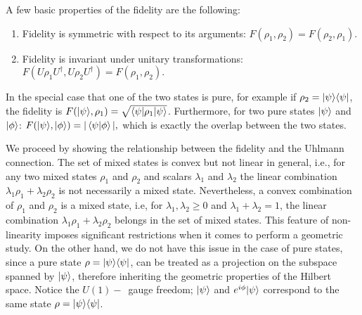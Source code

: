A few basic properties of the fidelity are the following:

\begin{enumerate}
	\item Fidelity is symmetric with respect to its arguments: $F(\rho_1,\rho_2)=F(\rho_2,\rho_1)$.
	\item Fidelity is invariant under unitary transformations: $F(U\rho_1 U^\dagger,U\rho_2 U^\dagger)=F(\rho_1,\rho_2).$
\end{enumerate}
In the special case that one of the two states is pure, for example if $\rho_2=| \psi \rangle\langle \psi |$, the fidelity is $F(| \psi \rangle,\rho_1)=\sqrt{\braket{\psi|\rho_1|\psi}}$. Furthermore, for two pure states $| \psi \rangle$ and $| \phi \rangle$: $F(| \psi \rangle,| \phi \rangle)=|\braket{\psi|\phi}|,$ which is exactly the overlap between the two states.

We proceed by showing the relationship between the fidelity and the Uhlmann connection. The set of mixed states is convex but not linear in general, i.e., for any two mixed states $\rho_1$ and $\rho_2$ and scalars $\lambda_1$ and $\lambda_2$ the linear combination $\lambda_1\rho_1+\lambda_2\rho_2$ is not necessarily a mixed state. Nevertheless, a convex combination of $\rho_1$ and $\rho_2$ is a mixed state, i.e, for
 $\lambda_1,\lambda_2\geq 0$ and $\lambda_1+\lambda_2=1$, the linear combination $\lambda_1\rho_1+\lambda_2\rho_2$ belongs in the set of mixed states. This feature of non-linearity imposes significant restrictions when it comes to perform a geometric study. 
 On the other hand, we do not have this issue in the case of pure states, since a pure state $\rho=| \psi \rangle\langle \psi |$, can be treated as a projection on the subspace spanned by $| \psi \rangle$, therefore inheriting the geometric properties of the Hilbert space. Notice the $U(1)-$~gauge freedom; $| \psi \rangle$ and $e^{i\phi}| \psi \rangle$ correspond to the same state $\rho=| \psi \rangle\langle \psi |$.

